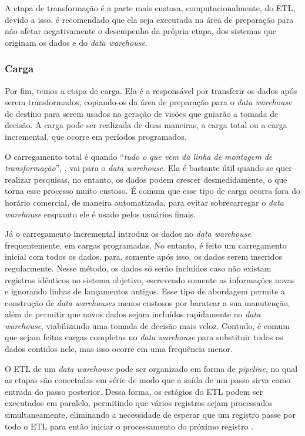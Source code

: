 A etapa de transformação é a parte mais custosa, computacionalmente, do ETL, devido a isso, é recomendado que ela seja executada na área de preparação para não afetar negativamente o desempenho da própria etapa, dos sistemas que originam os dados e do \textit{data warehouse}.

\subsubsection{Carga}
\label{subsec:carga}
Por fim, temos a etapa de carga. Ela é a responsável por transferir os dados após serem transformados, copiando-os da área de preparação para o \textit{data warehouse} de destino para serem usados na geração de visões que guiarão a tomada de decisão. A carga pode ser realizada de duas maneiras, a carga total ou a carga incremental, que ocorre em períodos programados.

O carregamento total é quando \enquote{\textit{tudo o que vem da linha de montagem de transformação}}, \cite{vida2021datawarehouse}, vai para o \textit{data warehouse}. Ela é bastante útil quando se quer realizar pesquisas, no entanto, os dados podem crescer desmedidamente, o que torna esse processo muito custoso. É comum que esse tipo de carga ocorra fora do horário comercial, de maneira automatizada, para evitar sobrecarregar o \textit{data warehouse} enquanto ele é usado pelos usuários finais.

Já o carregamento incremental introduz os dados no \textit{data warehouse} frequentemente, em cargas programadas. No entanto, é feito um carregamento inicial com todos os dados, para, somente após isso, os dados serem inseridos regularmente. Nesse método, os dados só serão incluídos caso não existam registros idênticos no sistema objetivo, escrevendo somente as informações novas e ignorando linhas de lançamentos antigos. Esse tipo de abordagem permite a construção de \textit{data warehouses} menos custosos por baratear a sua manutenção, além de permitir que novos dados sejam incluídos rapidamente no \textit{data warehouse}, viabilizando uma tomada de decisão mais veloz. Contudo, é comum que sejam feitas cargas completas no \textit{data warehouse} para substituir todos os dados contidos nele, mas isso ocorre em uma frequência menor.

O ETL de um \textit{data warehouse} pode ser organizado em forma de \textit{pipeline}, no qual as etapas são conectadas em série de modo que a saída de um passo sirva como entrada do passo posterior. Dessa forma, os estágios do ETL podem ser executados em paralelo, permitindo que vários registros sejam processados simultaneamente, eliminando a necessidade de esperar que um registro passe por todo o ETL para então iniciar o processamento do próximo registro \cite{vida2021datawarehouse}.

